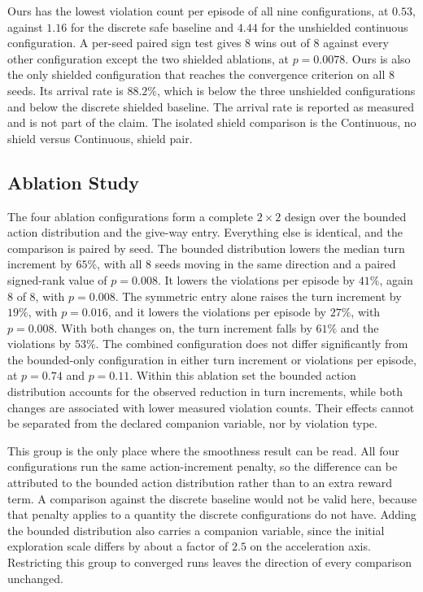 \documentclass[10pt,letterpaper]{article}
\begin{document}
Ours has the lowest violation count
per episode of all nine configurations, at $0.53$, against $1.16$ for the discrete safe
baseline and $4.44$ for the unshielded continuous configuration. A per-seed paired sign test
gives $8$ wins out of $8$ against every other configuration except the two shielded
ablations, at $p=0.0078$. Ours is also the only shielded configuration that reaches the convergence
criterion on all $8$ seeds. Its arrival rate is $88.2\%$, which is below the three
unshielded configurations and below the discrete shielded baseline. The arrival rate is reported as measured and is not part of the claim. The isolated shield comparison is the Continuous, no
shield versus Continuous, shield pair.

\subsection{Ablation Study}
\label{sec:res-ablation}

The four ablation configurations form a complete $2\times2$ design over the bounded action
distribution and the give-way entry. Everything else is identical, and the comparison is
paired by seed. The bounded distribution lowers the median turn increment by $65\%$, with
all $8$ seeds moving in the same direction and a paired signed-rank value of $p=0.008$. It
lowers the violations per episode by $41\%$, again $8$ of $8$, with $p=0.008$. The symmetric entry alone raises the turn increment by $19\%$, with $p=0.016$, and it lowers the
violations per episode by $27\%$, with $p=0.008$. With both changes on, the turn increment
falls by $61\%$ and the violations by $53\%$. The combined configuration does not differ significantly from the bounded-only
configuration in either turn increment or violations per episode, at $p=0.74$ and
$p=0.11$. Within this ablation set the bounded action distribution accounts for the
observed reduction in turn increments, while both changes are associated with lower
measured violation counts. Their effects cannot be separated from the declared companion
variable, nor by violation type.

This group is the only place where the smoothness result can be read. All four
configurations run the same action-increment penalty, so the difference can be attributed
to the bounded action distribution rather than to an extra reward term. A comparison against
the discrete baseline would not be valid here, because that penalty applies to a quantity
the discrete configurations do not have. Adding the bounded distribution also carries a companion
variable, since the initial exploration scale differs by about a factor of $2.5$ on the
acceleration axis. Restricting this group to converged runs leaves the direction of every comparison
unchanged.
\end{document}
